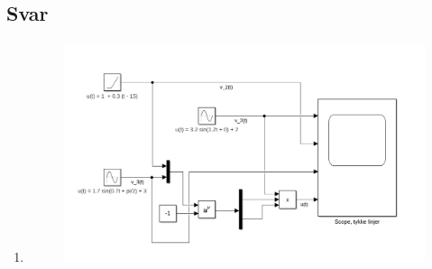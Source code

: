 \documentclass[answers,11pt]{exam}
\begin{document}
\begin{enumerate}[label=\alph*)]
\begin{tcolorbox}
  \end{tcolorbox}

  \newpage
  

  \begin{tcolorbox}
    \subsection*{Svar}

    \begin{enumerate}[label=g\arabic*)]

      \item
            \parbox{\textwidth}{
              \begin{figure}[H]
                \centering
                \hspace{0mm}\scalebox{0.21}
                {\includegraphics{figurer/v123.png}}
                \label{fig:2g1}
              \end{figure}
            }


\end{enumerate}
\end{tcolorbox}
\end{enumerate}
\end{document}
